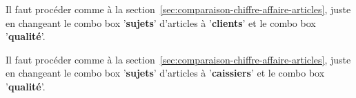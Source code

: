 

Il faut proc\'eder comme \`a la section~\ref{sec:comparaison-chiffre-affaire-articles}, juste
en changeant le combo box '\textbf{sujets}' d'articles \`a
'\textbf{clients}' et le combo box '\textbf{qualit\'e}'.



Il faut proc\'eder comme \`a la section~\ref{sec:comparaison-chiffre-affaire-articles}, juste
en changeant le combo box '\textbf{sujets}' d'articles \`a
'\textbf{caissiers}' et le combo box '\textbf{qualit\'e}'.

